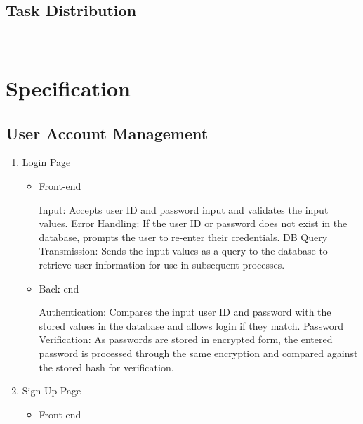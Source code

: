 \documentclass[conference]{IEEEtran}
\begin{document}
\subsection{Task Distribution}

-

\section{Specification}

\subsection{User Account Management}

\begin{enumerate}
\setlength{\parindent}{2ex}
\item Login Page

\begin{itemize}
\setlength{\parindent}{2ex}
\item Front-end

Input: Accepts user ID and password input and validates the input values. \newline\hspace*{1.2ex}
Error Handling: If the user ID or password does not exist in the database, prompts the user to re-enter their credentials.\newline\hspace*{1.2ex}
DB Query Transmission: Sends the input values as a query to the database to retrieve user information for use in subsequent processes.

\item Back-end

Authentication: Compares the input user ID and password with the stored values in the database and allows login if they match. \newline\hspace*{1.2ex}
Password Verification: As passwords are stored in encrypted form, the entered password is processed through the same encryption and compared against the stored hash for verification.

\end{itemize}

\item Sign-Up Page

\begin{itemize}
\setlength{\parindent}{2ex}
\item Front-end


\end{itemize}
\end{enumerate}
\end{document}
